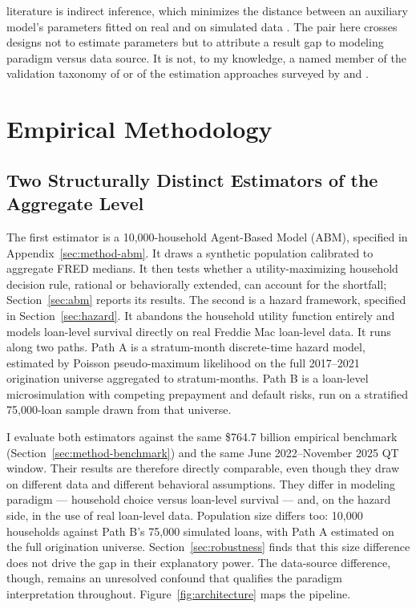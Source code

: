 \documentclass[12pt]{article}
\begin{document}
literature is indirect inference, which minimizes the distance between an auxiliary model's parameters fitted on real and on simulated data \citep{platt2020}. The pair here crosses designs not to estimate parameters but to attribute a result gap to modeling paradigm versus data source. It is not, to my knowledge, a named member of the validation taxonomy of \citet{fagiolo2007} or of the estimation approaches surveyed by \citet{grazzini2017} and \citet{platt2020}.
\section{Empirical Methodology}\label{sec:method}

\subsection{Two Structurally Distinct Estimators of the Aggregate Level}\label{sec:method-estimators}

The first estimator is a 10,000-household Agent-Based Model (ABM), specified in Appendix~\ref{sec:method-abm}. It draws a synthetic population calibrated to aggregate FRED medians. It then tests whether a utility-maximizing household decision rule, rational or behaviorally extended, can account for the shortfall; Section~\ref{sec:abm} reports its results. The second is a hazard framework, specified in Section~\ref{sec:hazard}. It abandons the household utility function entirely and models loan-level survival directly on real Freddie Mac loan-level data. It runs along two paths. Path A is a stratum-month discrete-time hazard model, estimated by Poisson pseudo-maximum likelihood on the full 2017--2021 origination universe aggregated to stratum-months. Path B is a loan-level microsimulation with competing prepayment and default risks, run on a stratified 75,000-loan sample drawn from that universe.

I evaluate both estimators against the same \$764.7 billion empirical benchmark (Section~\ref{sec:method-benchmark}) and the same June 2022--November 2025 QT window. Their results are therefore directly comparable, even though they draw on different data and different behavioral assumptions. They differ in modeling paradigm --- household choice versus loan-level survival --- and, on the hazard side, in the use of real loan-level data. Population size differs too: 10,000 households against Path B's 75,000 simulated loans, with Path A estimated on the full origination universe. Section~\ref{sec:robustness} finds that this size difference does not drive the gap in their explanatory power. The data-source difference, though, remains an unresolved confound that qualifies the paradigm interpretation throughout. Figure~\ref{fig:architecture} maps the pipeline.
\end{document}
